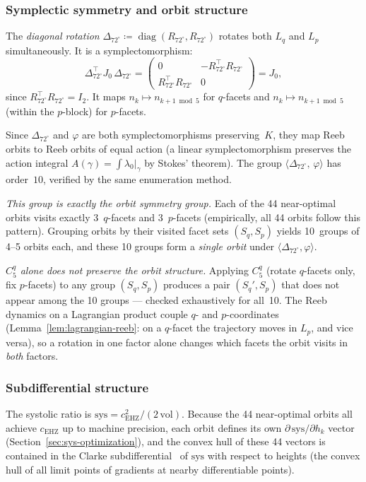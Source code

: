 \subsubsection*{Symplectic symmetry and orbit structure}

The \emph{diagonal rotation}
$\Delta_{72^\circ} \coloneqq \operatorname{diag}(R_{72^\circ}, R_{72^\circ})$
rotates both $L_q$ and $L_p$ simultaneously.
It is a symplectomorphism:
\[
  \Delta_{72^\circ}^\top J_0\, \Delta_{72^\circ}
  = \begin{pmatrix} 0 & -R_{72^\circ}^\top R_{72^\circ} \\
    R_{72^\circ}^\top R_{72^\circ} & 0 \end{pmatrix}
  = J_0,
\]
since $R_{72^\circ}^\top R_{72^\circ} = I_2$.
It maps $n_k \mapsto n_{k+1\bmod 5}$ for $q$-facets and
$n_k \mapsto n_{k+1\bmod 5}$ (within the $p$-block) for $p$-facets.

Since $\Delta_{72^\circ}$ and $\varphi$ are both symplectomorphisms
preserving~$K$,
they map Reeb orbits to Reeb orbits of equal action
(a linear symplectomorphism preserves the action integral
$A(\gamma) = \int \lambda_0|_\gamma$ by Stokes' theorem).
The group $\langle \Delta_{72^\circ},\, \varphi \rangle$ has order~$10$,
verified by the same enumeration method.

\emph{This group is exactly the orbit symmetry group.}
Each of the 44 near-optimal orbits visits exactly
3~$q$-facets and 3~$p$-facets (empirically, all 44 orbits follow this
pattern).
Grouping orbits by their visited facet sets $(S_q, S_p)$ yields
10~groups of 4--5 orbits each, and these 10 groups form a
\emph{single orbit} under $\langle \Delta_{72^\circ}, \varphi \rangle$.

\emph{$C_5^q$ alone does not preserve the orbit structure.}
Applying $C_5^q$ (rotate $q$-facets only, fix $p$-facets) to any
group $(S_q, S_p)$ produces a pair $(S_q', S_p)$ that does not
appear among the 10 groups ---
checked exhaustively for all~10.
The Reeb dynamics on a Lagrangian product couple $q$- and
$p$-coordinates (Lemma~\ref{lem:lagrangian-reeb}: on a $q$-facet
the trajectory moves in $L_p$, and vice versa), so a rotation
in one factor alone changes which facets the orbit visits in
\emph{both} factors.

\subsubsection*{Subdifferential structure}

The systolic ratio is $\mathrm{sys} = c_{\mathrm{EHZ}}^2 / (2\,\mathrm{vol})$.
Because the 44 near-optimal orbits all achieve $c_{\mathrm{EHZ}}$ up to
machine precision, each orbit defines its own
$\partial\,\mathrm{sys}/\partial h_k$ vector
(Section~\ref{sec:sys-optimization}),
and the convex hull of these 44 vectors is contained in the Clarke
subdifferential~\cite{Clarke1983} of $\mathrm{sys}$ with respect to
heights (the convex hull of all limit points of gradients at nearby
differentiable points).

